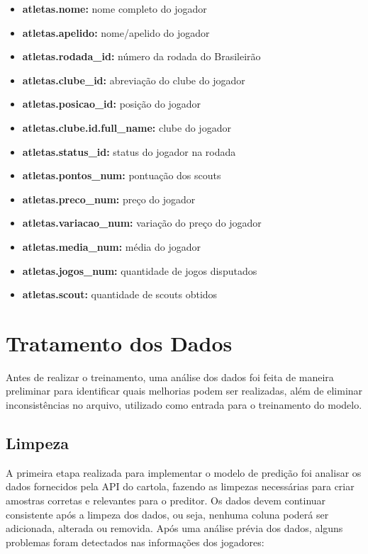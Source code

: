 \documentclass[conference]{IEEEtran}
\begin{document}
\begin{itemize}

\item \textbf{atletas.nome:}                nome completo do jogador
\item \textbf{atletas.apelido:}             nome/apelido do jogador
\item \textbf{atletas.rodada\_id:}          número da rodada do Brasileirão
\item \textbf{atletas.clube\_id:}           abreviação do clube do jogador
\item \textbf{atletas.posicao\_id:}         posição do jogador
\item \textbf{atletas.clube.id.full\_name:} clube do jogador
\item \textbf{atletas.status\_id:}          status do jogador na rodada
\item \textbf{atletas.pontos\_num:}         pontuação dos scouts
\item \textbf{atletas.preco\_num:}          preço do jogador
\item \textbf{atletas.variacao\_num:}       variação do preço do jogador
\item \textbf{atletas.media\_num:}          média do jogador
\item \textbf{atletas.jogos\_num:}          quantidade de jogos disputados
\item \textbf{atletas.scout:}               quantidade de scouts obtidos

\end{itemize}

\section{Tratamento dos Dados}

Antes  de realizar  o treinamento,  uma análise  dos dados  foi feita
de  maneira  preliminar para  identificar  quais  melhorias podem  ser
realizadas, além  de eliminar inconsistências no  arquivo, utilizado
como entrada para o treinamento do modelo.

\subsection{Limpeza}

A primeira  etapa realizada  para implementar  o modelo  de predição
foi  analisar os  dados fornecidos  pela  API do  cartola, fazendo  as
limpezas necessárias para criar amostras corretas e relevantes para o
preditor. Os  dados devem  continuar consistente  após a  limpeza dos
dados, ou  seja, nenhuma  coluna poderá  ser adicionada,  alterada ou
removida. Após uma análise prévia dos dados, alguns problemas foram
detectados nas informações dos jogadores:
\end{document}
